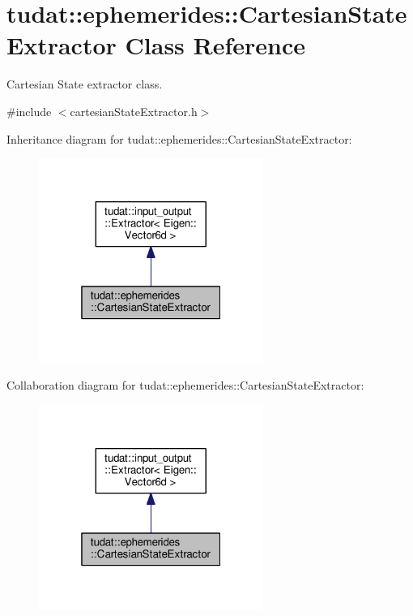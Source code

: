 \hypertarget{classtudat_1_1ephemerides_1_1CartesianStateExtractor}{}\section{tudat\+:\+:ephemerides\+:\+:Cartesian\+State\+Extractor Class Reference}
\label{classtudat_1_1ephemerides_1_1CartesianStateExtractor}


Cartesian State extractor class.  




{\ttfamily \#include $<$cartesian\+State\+Extractor.\+h$>$}



Inheritance diagram for tudat\+:\+:ephemerides\+:\+:Cartesian\+State\+Extractor\+:
\nopagebreak
\begin{figure}[H]
\begin{center}
\leavevmode
\includegraphics[width=208pt]{classtudat_1_1ephemerides_1_1CartesianStateExtractor__inherit__graph}
\end{center}
\end{figure}


Collaboration diagram for tudat\+:\+:ephemerides\+:\+:Cartesian\+State\+Extractor\+:
\nopagebreak
\begin{figure}[H]
\begin{center}
\leavevmode
\includegraphics[width=208pt]{classtudat_1_1ephemerides_1_1CartesianStateExtractor__coll__graph}
\end{center}
\end{figure}
